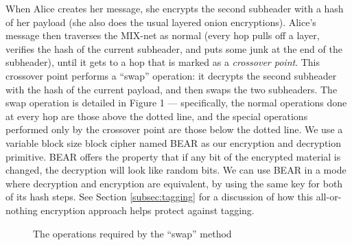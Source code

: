 \documentclass{llncs}
\begin{document}
When Alice creates her message, she encrypts the second subheader
with a hash of her payload (she also does the usual layered onion
encryptions). Alice's message then traverses the MIX-net as normal (every
hop pulls off a layer, verifies the hash of the current subheader,
and puts some junk at the end of the subheader), until it gets to a
hop that is marked as a \emph{crossover point}. This crossover point
performs a ``swap'' operation: it decrypts the second subheader with
the hash of the current payload, and then swaps the two subheaders. The
swap operation is detailed in Figure 1 --- specifically, the normal
operations done at every hop are those above the dotted line, and the
special operations performed only by the crossover point are those below
the dotted line.  We use a variable block size block cipher named BEAR
\cite{BEAR} as our encryption and decryption primitive.  BEAR offers
the property that if any bit of the encrypted material is changed, the
decryption will look like random bits. We can use BEAR in a mode where
decryption and encryption are equivalent, by using the same key for
both of its hash steps. See Section \ref{subsec:tagging} for a discussion of
how this all-or-nothing encryption approach helps protect against tagging.


\begin{figure}
\begin{center}
\caption{The operations required by the ``swap'' method} 
\end{center}
\end{figure}
\end{document}
